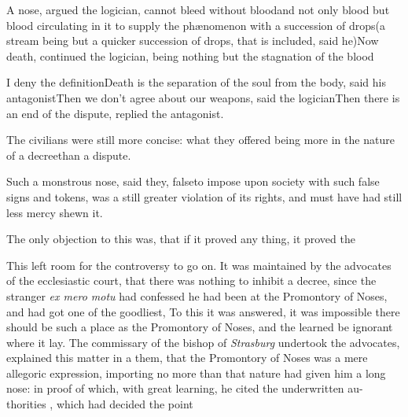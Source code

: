 \documentclass{article}
\begin{document}
A nose, argued the logician, cannot bleed without
blood\tsk and not only blood
\tsk but blood circulating in it to
supply the phænomenon with a succession of drops\tsk (a
stream being but a quicker succession of drops, that is included,
said he)\tsk Now death, continued the logician, being
nothing but the stagnation of the blood\tsh

I deny the definition\tsh Death is the separation of
the soul from the body, said his antagonist\tsk Then we
don’t agree about our weapons, said the
logician\tsk Then there is an end of the dispute, re\-plied the
antagonist.

The civilians were still more concise: what they offered being
more in the nature of a decree\tsk than a dispute.

\tsk Such a monstrous nose, said they, 
false\tsk to impose upon society with such false signs and
tokens, was a still greater violation of its rights, and must have
had still less mercy shewn it.

The only objection to this was, that\break
if it proved any thing, it proved the\break
{}

This left room for the controversy to go on. It was maintained by the advocates
of the ecclesiastic court, that there was nothing to inhibit a decree, since
the stranger \textit{ex mero motu} had confessed he had been at the Promontory of
Noses, and had got one of the goodliest, \etc\etc\break
\tsk To this
it was answered, it was impossible there should be such a place as the
Promontory of Noses, and the learned be ignorant where it lay. The commissary
of the bishop of \textit{Strasburg} undertook the
advocates, explained this matter in a\break
{}
them, that the Promontory of Noses was
a mere allegoric expression, importing no more than that nature
had given him a long nose: in proof of which, with great learning, he cited the
underwritten au-\break
thorities \fnast, which had decided the point\break
{}
\end{document}

